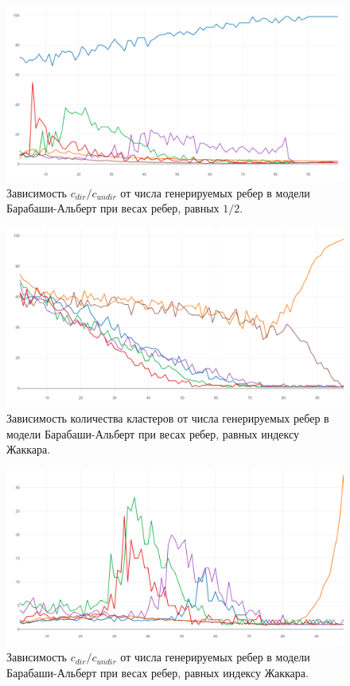 \begin{figure}[h!]
	\centering
	\includegraphics[width=\textwidth]{pics/ba_static_d.png}
	\caption{Зависимость $c_{dir}/c_{undir}$ от числа генерируемых ребер в модели Барабаши-Альберт при весах ребер, равных $1/2$.}
	\label{fig:cc_ba_s}
\end{figure}

\begin{figure}[h!]
	\centering
	\includegraphics[width=\textwidth]{pics/ba_jaccard.png}
	\caption{Зависимость количества кластеров от числа генерируемых ребер в модели Барабаши-Альберт при весах ребер, равных индексу Жаккара.}
	\label{fig:c_ba_j}
\end{figure}

\begin{figure}[h!]
	\centering
	\includegraphics[width=\textwidth]{pics/ba_jaccard_d.png}
	\caption{Зависимость $c_{dir}/c_{undir}$ от числа генерируемых ребер в модели Барабаши-Альберт при весах ребер, равных индексу Жаккара.}
	\label{fig:cc_ba_j}
\end{figure}

